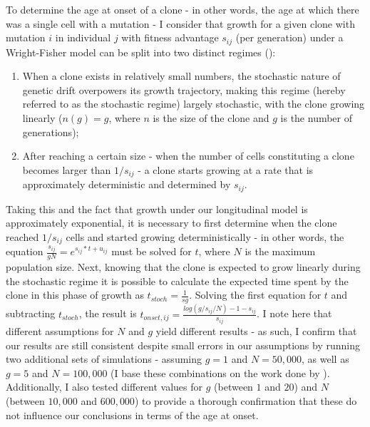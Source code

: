 To determine the age at onset of a clone - in other words, the age at which there was a single cell with a mutation - I consider that growth for a given clone with mutation $i$ in individual $j$ with fitness advantage $s_{ij}$ (per generation) under a Wright-Fisher model can be split into two distinct regimes ():

\begin{enumerate}
    \item When a clone exists in relatively small numbers, the stochastic nature of genetic drift overpowers its growth trajectory, making this regime (hereby referred to as the stochastic regime) largely stochastic, with the clone growing linearly ($n(g) = g$, where $n$ is the size of the clone and $g$ is the number of generations);
    \item After reaching a certain size - when the number of cells constituting a clone becomes larger than $1/s_{ij}$ - a clone starts growing at a rate that is approximately deterministic and determined by $s_{ij}$.
\end{enumerate}

\begin{figure}
	\label{fig:wf-example}
\end{figure}

Taking this and the fact that growth under our longitudinal model is approximately exponential, it is necessary to first determine when the clone reached $1/s_{ij}$ cells and started growing deterministically - in other words, the equation $\frac{s_{ij}}{gN} = e^{s_{ij} * t + u_{ij}}$ must be solved for $t$, where $N$ is the maximum population size. Next, knowing that the clone is expected to grow linearly during the stochastic regime it is possible to calculate the expected time spent by the clone in this phase of growth as $t_{stoch} = \frac{1}{sg}$. Solving the first equation for $t$ and subtracting $t_{stoch}$, the result is $t_{onset,ij} = \frac{log(g/s_{ij}/N)-1-s_{ij}}{s_{ij}}$. I note here that different assumptions for $N$ and $g$ yield different results - as such, I confirm that our results are still consistent despite small errors in our assumptions by running two additional sets of simulations - assuming $g=1$ and $N=50,000$, as well as $g=5$ and $N=100,000$ (I base these combinations on the work done by  \cite{Lee-Six2018-lp}). Additionally, I also tested different values for $g$ (between $1$ and $20$) and $N$ (between $10,000$ and $600,000$) to provide a thorough confirmation that these do not influence our conclusions in terms of the age at onset.

